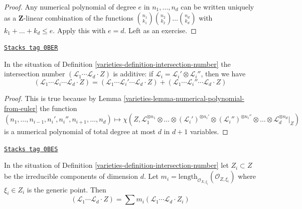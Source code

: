 \begin{proof}
Any numerical polynomial of degree $e$ in $n_1, \ldots, n_d$ can be
written uniquely as a $\mathbf{Z}$-linear combination of the functions
${n_1 \choose k_1}{n_2 \choose k_2} \ldots {n_d \choose k_d}$ with
$k_1 + \ldots + k_d \leq e$. Apply this with $e = d$.
Left as an exercise.
\end{proof}

\begin{lemma}
\label{varieties-lemma-intersection-number-additive}
\href{https://stacks.math.columbia.edu/tag/0BER}{\texttt{Stacks tag 0BER}}

In the situation of Definition \ref{varieties-definition-intersection-number}
the intersection number
$(\mathcal{L}_1 \cdots \mathcal{L}_d \cdot Z)$
is additive: if $\mathcal{L}_i = \mathcal{L}_i' \otimes \mathcal{L}_i''$,
then we have
$$
(\mathcal{L}_1 \cdots \mathcal{L}_i \cdots \mathcal{L}_d \cdot Z) =
(\mathcal{L}_1 \cdots \mathcal{L}_i' \cdots \mathcal{L}_d \cdot Z) +
(\mathcal{L}_1 \cdots \mathcal{L}_i'' \cdots \mathcal{L}_d \cdot Z)
$$
\end{lemma}

\begin{proof}

This is true because by Lemma \ref{varieties-lemma-numerical-polynomial-from-euler}
the function
$$
(n_1, \ldots, n_{i - 1}, n_i', n_i'', n_{i + 1}, \ldots, n_d)
\mapsto
\chi(Z, \mathcal{L}_1^{\otimes n_1} \otimes
\ldots \otimes (\mathcal{L}_i')^{\otimes n_i'} \otimes
(\mathcal{L}_i'')^{\otimes n_i''} \otimes \ldots \otimes
\mathcal{L}_d^{\otimes n_d}|_Z)
$$
is a numerical polynomial of total degree at most $d$ in $d + 1$ variables.
\end{proof}

\begin{lemma}
\label{varieties-lemma-intersection-number-in-terms-of-components}
\href{https://stacks.math.columbia.edu/tag/0BES}{\texttt{Stacks tag 0BES}}

In the situation of Definition \ref{varieties-definition-intersection-number}
let $Z_i \subset Z$ be the irreducible components of dimension $d$. Let
$m_i = \text{length}_{\mathcal{O}_{X, \xi_i}}(\mathcal{O}_{Z, \xi_i})$
where $\xi_i \in Z_i$ is the generic point. Then
$$
(\mathcal{L}_1 \cdots \mathcal{L}_d \cdot Z) =
\sum m_i(\mathcal{L}_1 \cdots \mathcal{L}_d \cdot Z_i)
$$
\end{lemma}

